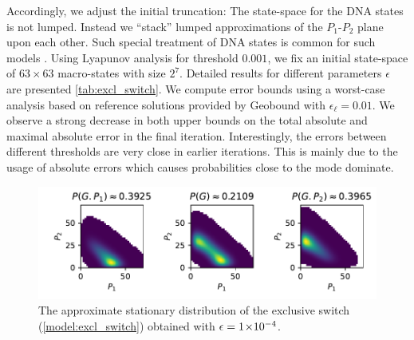 Accordingly, we adjust
the initial truncation:
The state-space for the \ac{DNA} states is not lumped. Instead we ``stack''
lumped approximations of the $P_1$-$P_2$ plane upon each other.
Such special treatment of \ac{DNA} states is common for such models \parencite{lapin2011shave}.
Using Lyapunov analysis for threshold $0.001$, we fix an initial state-space of $63\times 63$ macro-states with size $2^7$. Detailed results for different parameters $\epsilon$ are presented \autoref{tab:excl_switch}.
We compute error bounds using a worst-case analysis based on reference solutions provided by Geobound with $\epsilon_{\ell}=0.01$.
We observe a strong decrease in both upper bounds on the total absolute and maximal absolute error in the final iteration.
Interestingly, the errors between different thresholds are very close in earlier iterations.
This is mainly due to the usage of absolute errors which causes probabilities close to the mode dominate.
\begin{figure}[htb]
    \centering
    \includegraphics[width=\textwidth]{gfx/gexpr_approx.pdf}
	\caption[Approximate stationary distribution of the exclusive switch]{The approximate stationary distribution of the exclusive switch (\autoref{model:excl_switch}) obtained with $\epsilon= 1\!\times\hspace{-.5ex} 10^{-4} $.}
    \label{fig:excl_switch:excl_switch_dist}
\end{figure}


